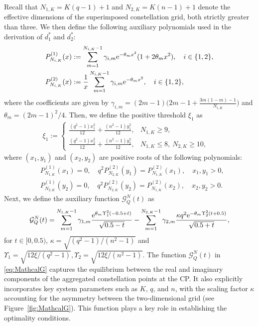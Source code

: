 \documentclass[journal,12pt,onecolumn,draftclsnofoot]{IEEEtran}
\theoremstyle{definition}
\begin{document}
Recall that $N_{1, K}=K(q-1)+1$ and $N_{2, K}=K(n-1)+1$ denote the effective dimensions of the superimposed constellation grid, both strictly greater than three. We then define the following auxiliary polynomials used in the derivation of $d_1^*$ and $d_2^*$:
\begin{subequations}
    \begin{align}
    P_{N_{i,K}}^{(1)}(x)& :=\sum_{m=1}^{N_{i,K}-1}\gamma_{i,m} {\rm e}^{-\theta_{m}x^{2}}(1+2\theta_{m}x^{2}), \quad i\in\{1,2\}, \\
     P^{(2)}_{N_{i,K}}(x) & := \frac{1}{x}\sum_{m=1}^{N_{i,K}-1}\gamma_{i,m}{\rm e}^{-\theta_{m}x^{2}},\quad i\in\{1,2\},
\end{align}
\end{subequations}
where the coefficients are given by $\gamma_{i,m} = (2m-1)\big(2m-1+\frac{3m(1-m)-1}{N_{i,K}}\big)$ and $\theta_m= (2m-1)^2/4$. Then, we define the positive threshold $\xi_1$  as 
\begin{align}
 \label{eq:r1r2def}
    \xi_1 := \begin{cases}  \frac{(q^2-1)x_1^2}{12} + \frac{(n^2-1)y_1^2}{12},&  N_{1, K}\geq 9, \\
        \frac{(q^2-1)x_2^2}{12} + \frac{(n^2-1)y_2^2}{12}, &  N_{1, K}\leq 8,~N_{2, K}\geq 10,
    \end{cases} \quad 
\end{align}
where $(x_1, y_1)$ and $(x_2, y_2)$ are positive roots of the following polynomials: 
\begin{subequations}
    \begin{align}
      & P_{N_{1,K}}^{(1)}(x_1) = 0,  \quad q^2 P_{N_{2,K}}^{(2)}(y_1) = {P_{N_{1,K}}^{(2)}(x_1)}, \quad x_1,y_1 >0, \\ 
      & P_{N_{2,K}}^{(1)}(y_2) = 0,  \quad q^2 P_{N_{2,K}}^{(2)}(y_2) = {P_{N_{1,K}}^{(2)}(x_2)}, \quad x_2,y_2 >0.  
\end{align}
\end{subequations}
 Next, we define the auxiliary function $\mathcal{G}_{Q}^{N}(t)$ as 
\begin{align}
     \label{eq:MathcalG}
    \mathcal{G}_{Q}^{N}(t) =  \sum_{m=1}^{N_{1,K}-1} {\gamma}_{1,m} \frac{{\rm e}^{\theta_{m}\Upsilon_1^2(-0.5+t)}}{\sqrt{0.5 - t}} -\sum_{m=1}^{N_{2,K}-1}{\gamma}_{2,m}\frac{\kappa q^2{\rm e}^{-\theta_{m}\Upsilon_2^2 (t+0.5)}}{\sqrt{0.5+t}},
\end{align}
for $ t\in [0,0.5)$, $\kappa = \sqrt{(q^2-1)/(n^2-1)}$ and $\Upsilon_1 =\sqrt{12\xi/(q^2-1)}, \Upsilon_2 =\sqrt{12\xi/(n^2-1)}$.  The function $\mathcal{G}_{Q}^{N}(t)$ in \eqref{eq:MathcalG} captures the equilibrium between the real and imaginary components of the aggregated constellation points at the CP. It also explicitly incorporates key system parameters such as  $K$, $q$, and $n$, with the scaling factor $\kappa$ accounting for the asymmetry between the two-dimensional grid (see Figure~\ref{fig:MathcalG}). This function plays a key role in establishing the optimality conditions.
\end{document}
